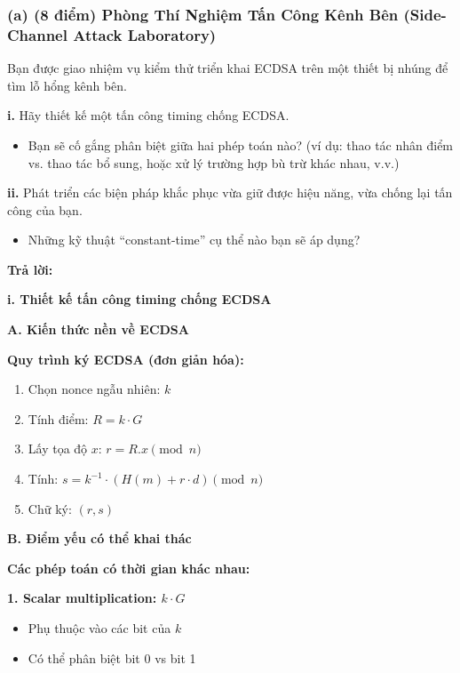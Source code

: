 \subsubsection{(a) (8 điểm) Phòng Thí Nghiệm Tấn Công Kênh Bên (Side-Channel Attack Laboratory)}

Bạn được giao nhiệm vụ kiểm thử triển khai ECDSA trên một thiết bị nhúng để tìm lỗ hổng kênh bên.

\textbf{i.} Hãy thiết kế một tấn công timing chống ECDSA.
\begin{itemize}
    \item Bạn sẽ cố gắng phân biệt giữa hai phép toán nào? (ví dụ: thao tác nhân điểm vs. thao tác bổ sung, hoặc xử lý trường hợp bù trừ khác nhau, v.v.)
\end{itemize}

\textbf{ii.} Phát triển các biện pháp khắc phục vừa giữ được hiệu năng, vừa chống lại tấn công của bạn.
\begin{itemize}
    \item Những kỹ thuật ``constant-time'' cụ thể nào bạn sẽ áp dụng?
\end{itemize}

\begin{center}
    \textbf{Trả lời:}
\end{center}

\textbf{i. Thiết kế tấn công timing chống ECDSA}

\textbf{A. Kiến thức nền về ECDSA}

\textbf{Quy trình ký ECDSA (đơn giản hóa):}
\begin{enumerate}
    \item Chọn nonce ngẫu nhiên: $k$
    \item Tính điểm: $R = k \cdot G$
    \item Lấy tọa độ $x$: $r = R.x \pmod{n}$
    \item Tính: $s = k^{-1} \cdot (H(m) + r \cdot d) \pmod{n}$
    \item Chữ ký: $(r, s)$
\end{enumerate}

\textbf{B. Điểm yếu có thể khai thác}

\textbf{Các phép toán có thời gian khác nhau:}

\textbf{1. Scalar multiplication: $k \cdot G$}
\begin{itemize}
    \item Phụ thuộc vào các bit của $k$
    \item Có thể phân biệt bit 0 vs bit 1
\end{itemize}

